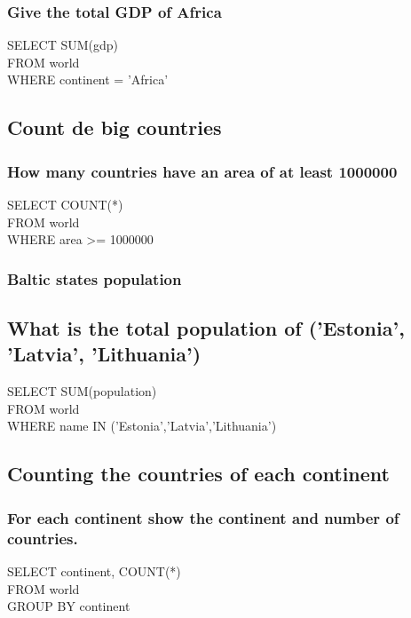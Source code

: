 \documentclass[10pt, oneside]{article}
\begin{document}
\subsubsection{Give the total GDP of Africa}

SELECT SUM(gdp)\\
FROM world\\
WHERE continent = 'Africa'\\

\subsection{Count de big countries}

\subsubsection{How many countries have an area of at least 1000000}

SELECT COUNT(*)\\
FROM world\\
WHERE area >= 1000000\\

\subsubsection{Baltic states population}

\subsection{What is the total population of ('Estonia', 'Latvia', 'Lithuania')}

SELECT SUM(population)\\
FROM world\\
WHERE name IN ('Estonia','Latvia','Lithuania')\\

\subsection{Counting the countries of each continent}

\subsubsection{For each continent show the continent and number of countries.}

SELECT continent, COUNT(*)\\
FROM world\\
GROUP BY continent\\
\end{document}

